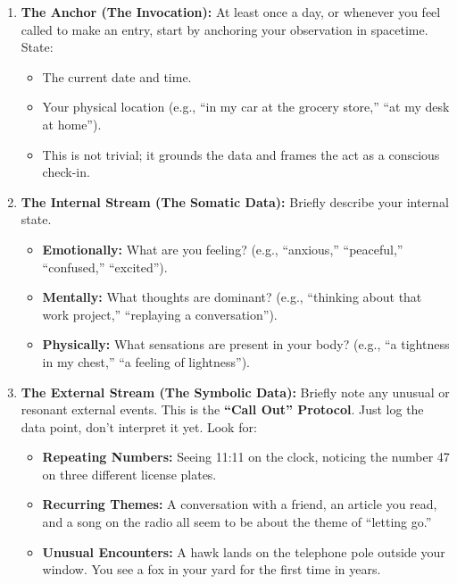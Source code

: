 \documentclass{article}
\begin{document}
\begin{enumerate}
\item
  \textbf{The Anchor (The Invocation):} At least once a day, or whenever you feel called to make an entry, start by anchoring your observation in spacetime. State:

  \begin{itemize}
  \item
    The current date and time.
  \item
    Your physical location (e.g., ``in my car at the grocery store,'' ``at my desk at home'').
  \item
    This is not trivial; it grounds the data and frames the act as a conscious check-in.
  \end{itemize}
\item
  \textbf{The Internal Stream (The Somatic Data):} Briefly describe your internal state.

  \begin{itemize}
  \item
    \textbf{Emotionally:} What are you feeling? (e.g., ``anxious,'' ``peaceful,'' ``confused,'' ``excited'').
  \item
    \textbf{Mentally:} What thoughts are dominant? (e.g., ``thinking about that work project,'' ``replaying a conversation'').
  \item
    \textbf{Physically:} What sensations are present in your body? (e.g., ``a tightness in my chest,'' ``a feeling of lightness'').
  \end{itemize}
\item
  \textbf{The External Stream (The Symbolic Data):} Briefly note any unusual or resonant external events. This is the \textbf{``Call Out'' Protocol}. Just log the data point, don't interpret it yet. Look for:

  \begin{itemize}
  \item
    \textbf{Repeating Numbers:} Seeing 11:11 on the clock, noticing the number 47 on three different license plates.
  \item
    \textbf{Recurring Themes:} A conversation with a friend, an article you read, and a song on the radio all seem to be about the theme of ``letting go.''
  \item
    \textbf{Unusual Encounters:} A hawk lands on the telephone pole outside your window. You see a fox in your yard for the first time in years.
  \end{itemize}
\end{enumerate}
\end{document}
